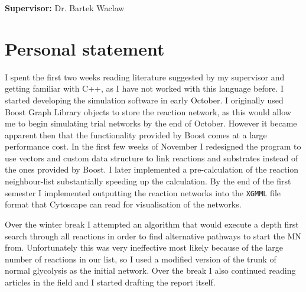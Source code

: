 \documentclass[a4paper,12pt]{article}
\begin{document}
\vfill
{\bf Supervisor:} Dr. Bartek Waclaw
\newpage



\setcounter{page}{1}
\footruleheight{1pt}
\headruleheight{1pt}
\rhead{- \thepage}
\cfoot{}

\cleardoublepage
\tableofcontents



%	
%
%
%
%
%
%


	\newpage
	\section*{Personal statement}
	I spent the first two weeks reading literature suggested by my supervisor and getting familiar with C++, as I have not worked with this language before. 
	I started developing the simulation software in early October. 	I originally used Boost Graph Library objects to store the reaction network, as this would allow me to begin simulating trial networks by the end of October. However it became apparent then that the functionality provided by Boost comes at a large performance cost. In the first few weeks of November I redesigned the program to use vectors and custom data structure to link reactions and substrates instead of the ones provided by Boost. I later implemented a pre-calculation of the reaction neighbour-list substantially speeding up the calculation. 
	By the end of the first semester I implemented outputting the reaction networks into the \texttt{XGMML} file format that Cytoscape can read for visualisation of the networks. 

	Over the winter break I attempted an algorithm that would execute a depth first search through all reactions in order to find alternative pathways to start the MN from. Unfortunately this was very ineffective most likely because of the large number of reactions in our list, so I used a modified version of the trunk of normal glycolysis as the initial network. Over the break I also continued reading articles in the field and I started drafting the report itself. 
\end{document}
